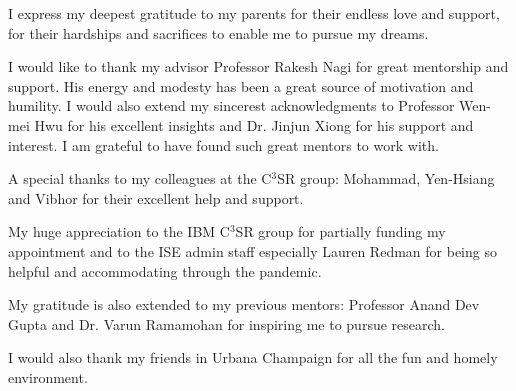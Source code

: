 I express my deepest gratitude to my parents for their endless love and support, for their hardships and sacrifices to enable me to pursue my dreams.

I would like to thank my advisor Professor Rakesh Nagi for great mentorship and support. His energy and modesty has been a great source of motivation and humility.
I would also extend my sincerest acknowledgments to Professor Wen-mei Hwu for his excellent insights and Dr. Jinjun Xiong for his support and interest.
I am grateful to have found such great mentors to work with.

A special thanks to my colleagues at the C$^3$SR group: Mohammad, Yen-Hsiang and Vibhor for their excellent help and support.

My huge appreciation to the IBM C$^3$SR group for partially funding my appointment and to the ISE admin staff especially Lauren Redman for being so helpful and accommodating through the pandemic.

My gratitude is also extended to my previous mentors: Professor Anand Dev Gupta and Dr. Varun Ramamohan for inspiring me to pursue research.

I would also thank my friends in Urbana Champaign for all the fun and homely environment.